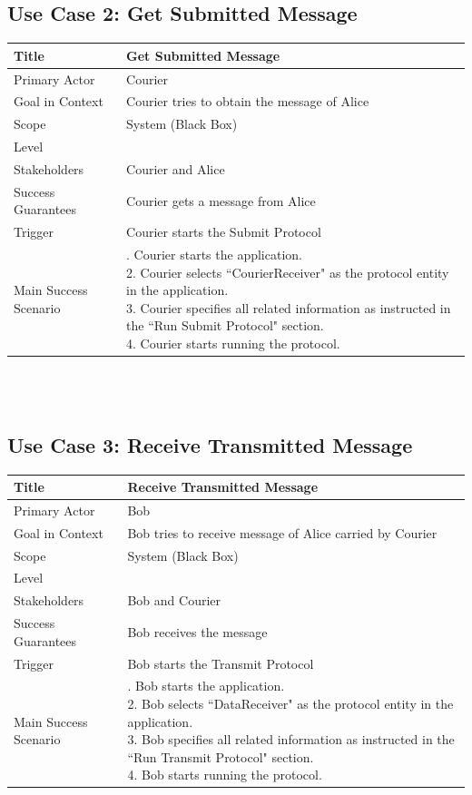 \subsection*{Use Case 2: Get Submitted Message} 
\begin{tabular}{|l|p{}|}
 \hline
 Title & Get Submitted Message \\ \hline
 Primary Actor & Courier \\ \hline
 Goal in Context & Courier tries to obtain the message of Alice \\ \hline
 Scope & System (Black Box) \\ \hline
 Level & \\ \hline
 Stakeholders & Courier and Alice \\ \hline
 Success Guarantees & Courier gets a message from Alice \\ \hline
 Trigger & Courier starts the Submit Protocol \\ \hline
 Main Success Scenario & 
 \parbox{9cm}{
  . Courier starts the application. \\
  2. Courier selects ``CourierReceiver" as the protocol entity in the application. \\
  3. Courier specifies all related information as instructed in the ``Run Submit Protocol" section. \\
  4. Courier starts running the protocol.
  \medskip
 }
 \\ \hline
\end{tabular}
\\
\\
\subsection*{Use Case 3: Receive Transmitted Message} 
\begin{tabular}{|l|p{}|}
 \hline
 Title & Receive Transmitted Message \\ \hline
 Primary Actor & Bob \\ \hline
 Goal in Context & Bob tries to receive message of Alice carried by Courier \\ \hline
 Scope & System (Black Box) \\ \hline
 Level & \\ \hline
 Stakeholders & Bob and Courier \\ \hline
 Success Guarantees & Bob receives the message \\ \hline
 Trigger & Bob starts the Transmit Protocol \\ \hline
 Main Success Scenario & 
 \parbox{9cm}{
  . Bob starts the application. \\
  2. Bob selects ``DataReceiver" as the protocol entity in the application. \\
  3. Bob specifies all related information as instructed in the ``Run Transmit Protocol" section. \\
  4. Bob starts running the protocol.
  \medskip
 }
 \\ \hline
\end{tabular}
\\ 
\\
